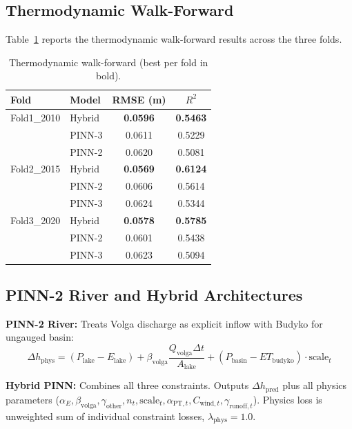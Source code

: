\documentclass[conference,a4paper]{IEEEtran}
\begin{document}
\subsection{Thermodynamic Walk-Forward}

Table~\ref{tab:thermo_walkforward} reports the thermodynamic walk-forward results across the three folds.

\begin{table}[htbp]
\centering
\caption{Thermodynamic walk-forward (best per fold in bold).}
\label{tab:thermo_walkforward}
\footnotesize
\begin{tabular}{llcc}
\toprule
\textbf{Fold} & \textbf{Model} & \textbf{RMSE (m)} & \textbf{$R^2$} \\
\midrule
Fold1\_2010 & Hybrid & \textbf{0.0596} & \textbf{0.5463} \\
            & PINN-3 & 0.0611 & 0.5229 \\
            & PINN-2 & 0.0620 & 0.5081 \\
Fold2\_2015 & Hybrid & \textbf{0.0569} & \textbf{0.6124} \\
            & PINN-2 & 0.0606 & 0.5614 \\
            & PINN-3 & 0.0624 & 0.5344 \\
Fold3\_2020 & Hybrid & \textbf{0.0578} & \textbf{0.5785} \\
            & PINN-2 & 0.0601 & 0.5438 \\
            & PINN-3 & 0.0623 & 0.5094 \\
\bottomrule
\end{tabular}
\end{table}

\subsection{PINN-2 River and Hybrid Architectures}

\textbf{PINN-2 River:} Treats Volga discharge as explicit inflow with Budyko for ungauged basin:
\begin{equation}
\Delta h_{\text{phys}} = (P_{\text{lake}} - E_{\text{lake}}) + \beta_{\text{volga}}\frac{Q_{\text{volga}}\Delta t}{A_{\text{lake}}} + (P_{\text{basin}} - ET_{\text{budyko}}) \cdot \text{scale}_t
\end{equation}

\textbf{Hybrid PINN:} Combines all three constraints. Outputs $\Delta h_{\text{pred}}$ plus all physics parameters ($\alpha_E,\beta_{\text{volga}},\gamma_{\text{other}},n_t,\text{scale}_t,\alpha_{\text{PT},t},C_{\text{wind},t},\gamma_{\text{runoff},t}$). Physics loss is unweighted sum of individual constraint losses, $\lambda_{\text{phys}}{=}1.0$.
\end{document}
